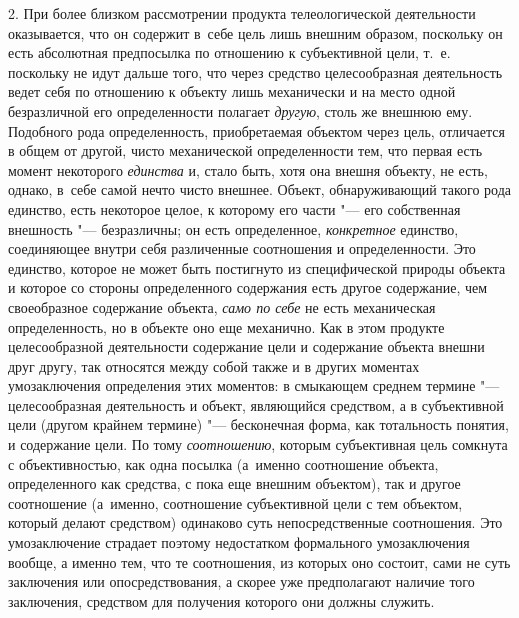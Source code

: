 2. При более близком рассмотрении продукта телеологической
деятельности оказывается, что он содержит в~себе цель лишь внешним образом,
поскольку он есть абсолютная предпосылка по отношению к субъективной цели,
т.~е. поскольку не идут дальше того, что через средство целесообразная
деятельность ведет себя по отношению к объекту лишь механически и на место
одной безразличной его определенности полагает {\em другую}, столь же
внешнюю ему. Подобного рода определенность, приобретаемая объектом через
цель, отличается в общем от другой, чисто механической
определенности тем, что первая есть момент некоторого
{\em единства} и, стало
быть, хотя она внешня объекту, не есть, однако, в~себе самой нечто чисто
внешнее. Объект, обнаруживающий такого рода единство, есть некоторое целое,
к которому его части "--- его собственная внешность
"--- безразличны; он есть определенное,
{\em конкретное}
единство, соединяющее внутри себя различенные соотношения и
определенности. Это единство, которое не может быть постигнуто из
специфической природы объекта и которое со стороны определенного содержания
есть другое содержание, чем своеобразное содержание объекта,
{\em само по себе} не
есть механическая определенность, но в объекте оно еще механично. Как в
этом продукте целесообразной деятельности содержание цели и содержание
объекта внешни друг другу, так относятся между собой также и в других
моментах умозаключения определения этих моментов: в смыкающем среднем
термине "--- целесообразная деятельность и объект, являющийся
средством, а в субъективной цели (другом крайнем термине)
"--- бесконечная форма, как тотальность понятия, и содержание
цели. По тому {\em соотношению},
которым субъективная цель сомкнута с объективностью, как одна
посылка (а~именно соотношение объекта, определенного как средства, с пока
еще внешним объектом), так и другое соотношение (а~именно, соотношение
субъективной цели с тем объектом, который делают средством) одинаково суть
непосредственные соотношения. Это умозаключение страдает поэтому
недостатком формального умозаключения вообще, а именно тем, что те
соотношения, из которых оно состоит, сами не суть заключения или
опосредствования, а скорее уже предполагают наличие того заключения,
средством для получения которого они должны служить.

